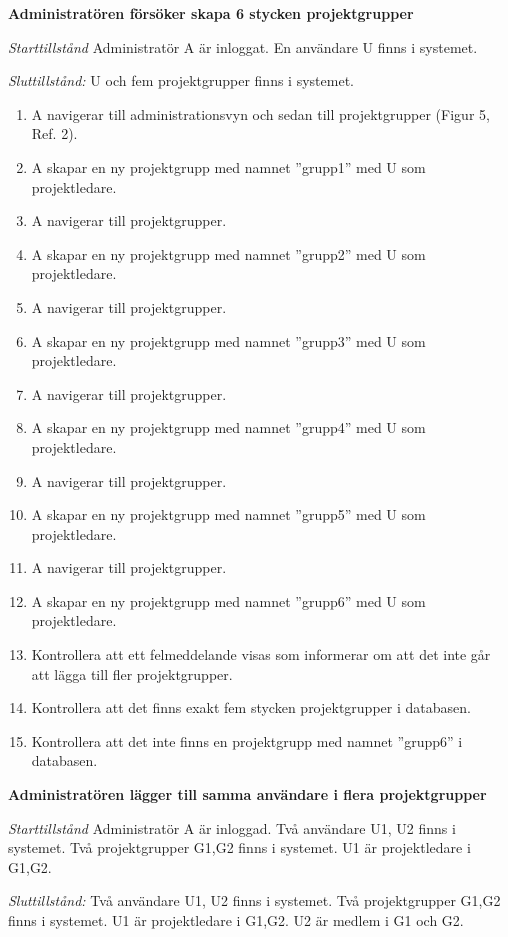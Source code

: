 \documentclass[a4paper]{article}
\begin{document}
\begin{FT}
\item
\textbf{Administratören försöker skapa 6 stycken projektgrupper}

\emph{Starttillstånd} Administratör A är inloggat. En användare U finns i systemet.

\emph{Sluttillstånd:} U och fem projektgrupper finns i systemet.

\begin{enumerate}
\item A navigerar till administrationsvyn och sedan till projektgrupper (Figur 5, Ref. 2).
\item A skapar en ny projektgrupp med namnet ''grupp1'' med U som projektledare.
\item A navigerar till projektgrupper.
\item A skapar en ny projektgrupp med namnet ''grupp2'' med U som projektledare.
\item A navigerar till projektgrupper.
\item A skapar en ny projektgrupp med namnet ''grupp3'' med U som projektledare.
\item A navigerar till projektgrupper.
\item A skapar en ny projektgrupp med namnet ''grupp4'' med U som projektledare.
\item A navigerar till projektgrupper.
\item A skapar en ny projektgrupp med namnet ''grupp5'' med U som projektledare.
\item A navigerar till projektgrupper.
\item A skapar en ny projektgrupp med namnet ''grupp6'' med U som projektledare.
\item Kontrollera att ett felmeddelande visas som informerar om att det inte går att lägga till fler projektgrupper.
\item Kontrollera att det finns exakt fem stycken projektgrupper i databasen.
\item Kontrollera att det inte finns en projektgrupp med namnet ''grupp6'' i databasen.
\end{enumerate}

\item
\textbf{Administratören lägger till samma användare i flera projektgrupper}

\emph{Starttillstånd} Administratör A är inloggad. Två användare U1, U2 finns i systemet. Två projektgrupper G1,G2 finns i systemet. U1 är projektledare i G1,G2.

\emph{Sluttillstånd:} Två användare U1, U2 finns i systemet. Två projektgrupper G1,G2 finns i systemet. U1 är projektledare i G1,G2. U2 är medlem i G1 och G2.


\end{FT}
\end{document}
